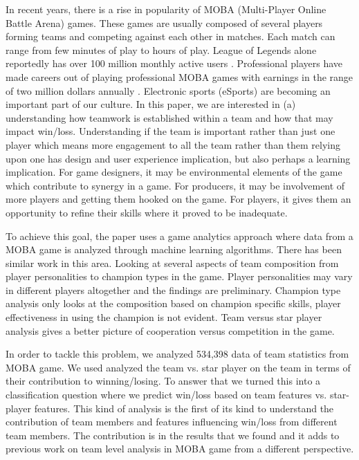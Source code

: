 \documentclass[conference]{IEEEtran}
\begin{document}
In recent years, there is a rise in popularity of MOBA (Multi-Player Online Battle Arena) games. These games are usually composed of several players forming teams and competing against each other in matches. Each match can range from few minutes of play to hours of play. League of Legends alone reportedly has over 100 million monthly active users \cite{Loterina}. Professional players have made careers out of playing professional MOBA games with earnings in the range of two million dollars annually \cite{esports}. Electronic sports (eSports) are becoming an important part of our culture. In this paper, we are interested in (a) understanding how teamwork is established within a team and how that may impact win/loss. Understanding if the team is important rather than just one player which means more engagement to all the team rather than them relying upon one has design and user experience implication, but also perhaps a learning implication. For game designers, it may be environmental elements of the game which contribute to synergy in a game. For producers, it may be involvement of more players and getting them hooked on the game. For players, it gives them an opportunity to refine their skills where it proved to be inadequate.

To achieve this goal, the paper uses a game analytics approach where data from a MOBA game is analyzed through machine learning algorithms. There has been similar work in this area. Looking at several aspects of team composition from player personalities to champion types in the game. Player personalities may vary in different players altogether and the findings are preliminary. Champion type analysis only looks at the composition based on champion specific skills, player effectiveness in using the champion is not evident. Team versus star player analysis gives a better picture of cooperation versus competition in the game.  

In order to tackle this problem, we analyzed 534,398 data of team statistics from MOBA game. We used analyzed the team vs. star player on the team in terms of their contribution to winning/losing. To answer that we turned this into a classification question where we predict win/loss based on team features vs. star-player features. This kind of analysis is the first of its kind to understand the contribution of team members and features influencing win/loss from different team members. The contribution is in the results that we found and it adds to previous work on team level analysis in MOBA game from a different perspective. 
\end{document}
